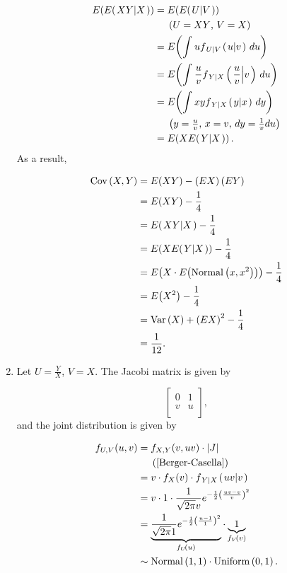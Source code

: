 \documentclass[12pt,letterpaper,reqno]{amsart}
\numberwithin{equation}{subsection}
\begin{document}
\begin{enumerate}[label=(\alph*),leftmargin=*]
\begin{align}
    \fun{E}{\fun{E}{\conditbar{XY}{X}}} &= \fun{E}{\fun{E}{\conditbar{U}{V}}} \nonumber \\
    & \ \ \ \ \left( \mbox{$U = XY$, $V = X$} \right) \nonumber \\
    &= \fun{E}{\myint{u \fun{f_{\conditbar{U}{V}}}{\conditbar{u}{v}}}{u}{}{}} \nonumber \\
    &= \fun{E}{\myint{\frac{u}{v} \fun{f_{\conditbar{Y}{X}}}{\conditbar{\frac{u}{v}}{v}}}{u}{}{}} \nonumber \\
    &= \fun{E}{\myint{xy \fun{f_{\conditbar{Y}{X}}}{\conditbar{y}{x}}}{y}{}{}} \nonumber \\
    & \ \ \ \ \left( \mbox{$y = \frac{u}{v}$, $x = v$, $dy = \frac{1}{v} du$} \right) \nonumber \\
    &= \fun{E}{X\fun{E}{\conditbar{Y}{X}}}.
\end{align}
As a result,

\begin{align*}
    \Cov{X,Y} &= \fun{E}{XY} - \left( EX \right) \left( EY \right) \\
    &= \fun{E}{XY} - \frac{1}{4} \\
    &= \fun{E}{\conditbar{XY}{X}} - \frac{1}{4} \\
    &= \fun{E}{X\fun{E}{\conditbar{Y}{X}}} - \frac{1}{4} \\
    &= \fun{E}{X \cdot \fun{E}{\normaldist{x, x^2}}} - \frac{1}{4} \\
    &= \fun{E}{X^2} - \frac{1}{4} \\
    &= \Var{X} + \left( EX \right)^2 - \frac{1}{4} \\
    &= \frac{1}{12}.
\end{align*}

\item Let $U = \frac{Y}{X}$, $V = X$. The Jacobi matrix is given by

\[ \left[ \begin{array}{cc}
     0 & 1 \\
     v & u \\
\end{array} \right], \]
and the joint distribution is given by

\begin{align*}
    \fun{f_{U,V}}{u,v} &= \fun{f_{X,Y}}{v, uv} \cdot \Abs{J} \\
    & \ \ \ \ \left( \mbox{\cite[page 158]{Berger-Casella}} \right) \\
    &= v \cdot \fun{f_X}{v} \cdot \fun{f_{\conditbar{Y}{X}}}{\conditbar{uv}{v}} \\
    &= v \cdot 1 \cdot \Gaussianpdf{uv}{v}{v} \\
    &= \underbrace{\Gaussianpdf{u}{1}{1}}_{\fun{f_U}{u}} \cdot \underbrace{1}_{\fun{f_V}{v}} \\
    &\sim \normaldist{1,1} \cdot \uniformdist{0,1}.
\end{align*}
\end{enumerate}

\newpage
\nocite{*}
\printbibliography
\end{document}
